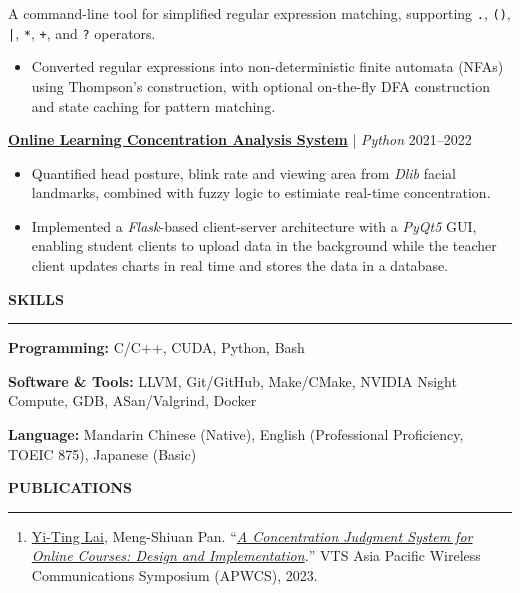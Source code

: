 \documentclass[11pt]{article}
\newcommand{\resumesection}[1]{%
    \vspace{8pt}
    \noindent\textbf{\large #1}\par
    \vspace{4pt}
    \hrule
    \vspace{6pt}
}
\begin{document}
A command-line tool for simplified regular expression matching, supporting \texttt{.}, \texttt{()}, \texttt{|}, \texttt{*}, \texttt{+}, and \texttt{?} operators.
\begin{itemize}[noitemsep, topsep=0pt, partopsep=0pt, parsep=0pt, leftmargin=*]
    \item Converted regular expressions into non-deterministic finite automata (NFAs) using Thompson's construction, with optional on-the-fly DFA construction and state caching for pattern matching.
\end{itemize}

\vspace{6pt}

\textbf{\href{https://github.com/Lai-YT/webcam-applications}{Online Learning Concentration Analysis System}} | \textit{Python} \hfill 2021--2022

\begin{itemize}[noitemsep, topsep=0pt, partopsep=0pt, parsep=0pt, leftmargin=*]
    \item Quantified head posture, blink rate and viewing area from \textit{Dlib} facial landmarks, combined with fuzzy logic to estimiate real-time concentration.
    \item Implemented a \textit{Flask}-based client-server architecture with a \textit{PyQt5} GUI, enabling student clients to upload data in the background while the teacher client updates charts in real time and stores the data in a database.
\end{itemize}

\resumesection{SKILLS}

\textbf{Programming:} C/C++, CUDA, Python, Bash

\textbf{Software \& Tools:} LLVM, Git/GitHub, Make/CMake, NVIDIA Nsight Compute, GDB, ASan/Valgrind, Docker

\textbf{Language:} Mandarin Chinese (Native), English (Professional Proficiency, TOEIC 875), Japanese (Basic)

\resumesection{PUBLICATIONS}

\begin{enumerate}[noitemsep, topsep=0pt, partopsep=0pt, parsep=0pt, leftmargin=*]
    \item \underline{Yi-Ting Lai}, Meng-Shiuan Pan. ``\textit{\href{https://ieeexplore.ieee.org/document/10234058}{A Concentration Judgment System for Online Courses: Design and Implementation}.}'' VTS Asia Pacific Wireless Communications Symposium (APWCS), 2023.
\end{enumerate}
\end{document}
